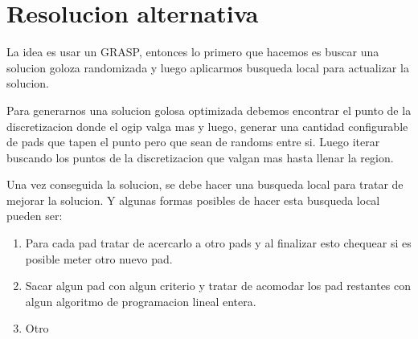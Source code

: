 \newpage
\section{Resolucion alternativa}
La idea es usar un GRASP, entonces lo primero que hacemos es buscar una solucion goloza randomizada y luego aplicarmos busqueda local para actualizar la solucion. 

Para generarnos una solucion golosa optimizada debemos encontrar el punto de la discretizacion donde el ogip valga mas y luego, generar una cantidad configurable de pads que tapen el punto pero que sean de randoms entre si. Luego iterar buscando los puntos de la discretizacion que valgan mas hasta llenar la region.

Una vez conseguida la solucion, se debe hacer una busqueda local para tratar de mejorar la solucion. Y algunas formas posibles de hacer esta busqueda local pueden ser:

\begin{enumerate}
\item Para cada pad tratar de acercarlo a otro pads y al finalizar esto chequear si es posible meter otro nuevo pad.
\item Sacar algun pad con algun criterio y tratar de acomodar los pad restantes con algun algoritmo de programacion lineal entera.
\item Otro
\end{enumerate}